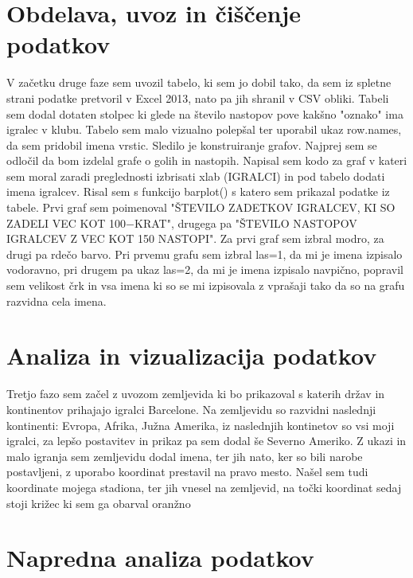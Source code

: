 \documentclass[11pt,a4paper]{article}
\begin{document}
\section{Obdelava, uvoz in čiščenje podatkov}
V začetku druge faze sem uvozil tabelo, ki sem jo dobil tako, da sem iz spletne strani podatke pretvoril v Excel 2013, nato pa jih shranil v CSV obliki. Tabeli sem dodal dotaten stolpec ki glede na število nastopov pove kakšno "oznako" ima igralec v klubu. Tabelo sem malo vizualno polepšal ter uporabil ukaz row.names, da sem pridobil imena vrstic. 
Sledilo je konstruiranje grafov. Najprej sem se odločil da bom izdelal grafe o golih in nastopih. Napisal sem kodo za graf v kateri sem moral zaradi preglednosti izbrisati xlab (IGRALCI) in pod tabelo dodati imena igralcev. Risal sem s funkcijo barplot() s katero sem prikazal podatke iz tabele. Prvi graf sem poimenoval "ŠTEVILO ZADETKOV IGRALCEV, KI SO ZADELI VEC KOT 100−KRAT", drugega pa "ŠTEVILO NASTOPOV IGRALCEV Z VEC KOT 150 NASTOPI". Za prvi graf sem izbral modro, za drugi pa rdečo barvo. Pri prvemu grafu sem izbral las=1, da mi je imena izpisalo vodoravno, pri drugem pa ukaz las=2, da mi je imena izpisalo navpično, popravil sem velikost črk in vsa imena ki so se mi izpisovala z vprašaji tako da so na grafu razvidna cela imena.


\section{Analiza in vizualizacija podatkov}
Tretjo fazo sem začel z uvozom zemljevida ki bo prikazoval s katerih držav in kontinentov prihajajo igralci Barcelone. Na zemljevidu so razvidni naslednji kontinenti: Evropa, Afrika, Južna Amerika, iz naslednjih kontinetov so vsi moji igralci, za lepšo postavitev in prikaz pa sem dodal še Severno Ameriko. Z ukazi in malo igranja sem zemljevidu dodal imena, ter jih nato, ker so bili narobe postavljeni, z uporabo koordinat prestavil na pravo mesto. Našel sem tudi koordinate mojega stadiona, ter jih vnesel na zemljevid, na točki koordinat sedaj stoji križec ki sem ga obarval oranžno


\section{Napredna analiza podatkov}
\end{document}
